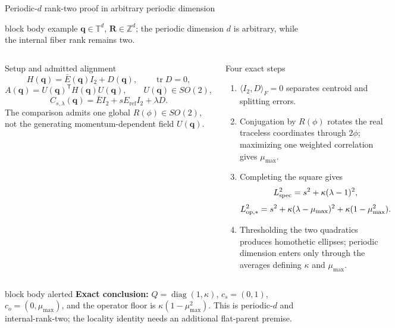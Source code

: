 \documentclass[aspectratio=169,10pt]{beamer}
\newcommand{\Eref}{E_{\mathrm{ref}}}
\begin{document}
\begin{frame}{Periodic-$d$ rank-two proof in arbitrary periodic dimension}
  \small
  \begin{beamercolorbox}[rounded=true,sep=0.30em,wd=\textwidth]{block body example}
    \centering
    $\mathbf q\in\mathbb T^d$, $\mathbf R\in\mathbb Z^d$;
    the periodic dimension $d$ is arbitrary, while the internal fiber rank remains two.
  \end{beamercolorbox}
  \vspace{0.15em}
  \begin{columns}[T]
      \begin{block}{Setup and admitted alignment}
        \scriptsize
        \[
          H(\mathbf q)=\bar E(\mathbf q)I_2+D(\mathbf q),
          \qquad \operatorname{tr}D=0,
        \]
        \[
          A(\mathbf q)=U(\mathbf q)^{\mathsf T}H(\mathbf q)U(\mathbf q),
          \qquad U(\mathbf q)\in SO(2),
        \]
        \[
          C_{s,\lambda}(\mathbf q)=\bar E I_2+s\Eref I_2+\lambda D.
        \]
        The comparison admits one global $R(\phi)\in SO(2)$, not the generating
        momentum-dependent field $U(\mathbf q)$.
      \end{block}
      \begin{exampleblock}{Four exact steps}
        \scriptsize
        \begin{enumerate}
          \setlength{\itemsep}{0.28em}
          \item $\langle I_2,D\rangle_F=0$ separates centroid and splitting errors.
          \item Conjugation by $R(\phi)$ rotates the real traceless coordinates through
            $2\phi$; maximizing one weighted correlation gives $\mu_{\max}$.
          \item Completing the square gives
            \[
              L_{\rm spec}^2=s^2+\kappa(\lambda-1)^2,
            \]
            \[
              L_{\rm op,*}^2=s^2+\kappa(\lambda-\mu_{\max})^2
              +\kappa(1-\mu_{\max}^2).
            \]
          \item Thresholding the two quadratics produces homothetic ellipses;
            periodic dimension enters only through the averages defining $\kappa$ and
            $\mu_{\max}$.
        \end{enumerate}
      \end{exampleblock}
  \end{columns}
  \vspace{0.08em}
  \begin{beamercolorbox}[rounded=true,sep=0.26em,wd=\textwidth]{block body alerted}
    \centering\scriptsize
    \textbf{Exact conclusion:}\quad
    $Q=\operatorname{diag}(1,\kappa)$,
    $c_s=(0,1)$,
    $c_o=(0,\mu_{\max})$, and the operator floor is
    $\kappa(1-\mu_{\max}^2)$.
    This is periodic-$d$ and internal-rank-two; the locality identity needs an additional
    flat-parent premise.
  \end{beamercolorbox}
\end{frame}
\end{document}
